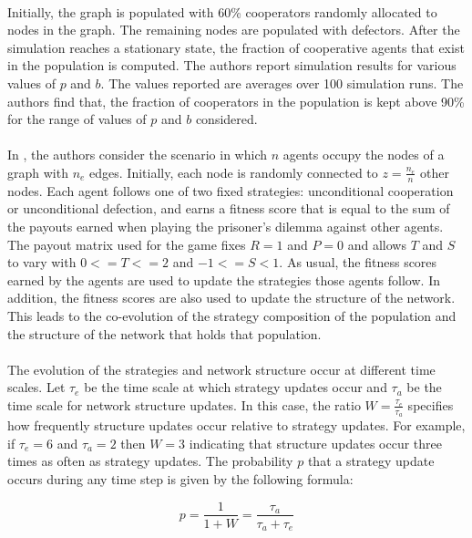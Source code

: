\documentclass{article}
\begin{document}
	\paragraph{}Initially, the graph is populated with 60\% cooperators randomly allocated to nodes in the graph.  The remaining nodes are populated with defectors.  After the simulation reaches a stationary state, the fraction of cooperative agents that exist in the population is computed.  The authors report simulation results for various values of $p$ and $b$.  The values reported are averages over 100 simulation runs.  The authors find that, the fraction of cooperators in the population is kept above 90\% for the range of values of $p$ and $b$ considered.
	\paragraph{}In \cite{Santos2006d}, the authors consider the scenario in which $n$ agents occupy the nodes of a graph with $n_e$ edges.  Initially, each node is randomly connected to $z=\frac{n_e}{n}$ other nodes.  Each agent follows one of two fixed strategies: unconditional cooperation or unconditional defection, and earns a fitness score that is equal to the sum of the payouts earned when playing the prisoner’s dilemma against other agents.  The payout matrix used for the game fixes $R=1$ and $P=0$ and allows $T$ and $S$ to vary with $0<=T<=2$ and $-1<=S<1$.  As usual, the fitness scores earned by the agents are used to update the strategies those agents follow.  In addition, the fitness scores are also used to update the structure of the network.  This leads to the co-evolution of the strategy composition of the population and the structure of the network that holds that population.
	\paragraph{}The evolution of the strategies and network structure occur at different time scales.  Let $\tau_e$ be the time scale at which strategy updates occur and $\tau_a$ be the time scale for network structure updates.  In this case, the ratio $W=\frac{\tau_e}{\tau_a}$ specifies how frequently structure updates occur relative to strategy updates.  For example, if $\tau_e=6$ and $\tau_a=2$ then $W=3$ indicating that structure updates occur three times as often as strategy updates.  The probability $p$ that a strategy update occurs during any time step is given by the following formula:
	
	\begin{equation}
	p=\frac{1}{1+W}=\frac{\tau_a}{\tau_a+\tau_e}
	\end{equation}
\end{document}
